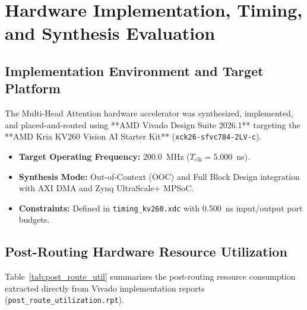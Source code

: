 \chapter{Hardware Implementation, Timing, and Synthesis Evaluation}
\label{chap:synthesis_evaluation}

\section{Implementation Environment and Target Platform}
The Multi-Head Attention hardware accelerator was synthesized, implemented, and placed-and-routed using **AMD Vivado Design Suite 2026.1** targeting the **AMD Kria KV260 Vision AI Starter Kit** (\texttt{xck26-sfvc784-2LV-c}). 

\begin{itemize}
    \item \textbf{Target Operating Frequency:} 200.0~MHz ($T_{\text{clk}} = 5.000$~ns).
    \item \textbf{Synthesis Mode:} Out-of-Context (OOC) and Full Block Design integration with AXI DMA and Zynq UltraScale+ MPSoC.
    \item \textbf{Constraints:} Defined in \texttt{timing\_kv260.xdc} with 0.500~ns input/output port budgets.
\end{itemize}

\section{Post-Routing Hardware Resource Utilization}
Table~\ref{tab:post_route_util} summarizes the post-routing resource consumption extracted directly from Vivado implementation reports (\texttt{post\_route\_utilization.rpt}).

